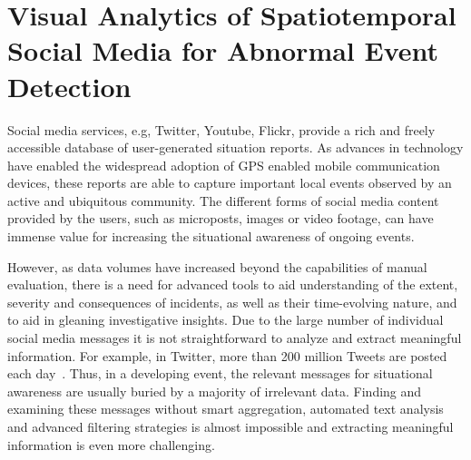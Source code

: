 \chapter{Visual Analytics of Spatiotemporal Social Media for Abnormal Event Detection}

Social media services, e.g, Twitter, Youtube, Flickr, provide a rich and freely accessible 
database of user-generated situation reports. As advances in technology have enabled
the widespread adoption of GPS enabled mobile communication
devices, these reports are able to capture important local events observed by an active and ubiquitous community.
The different forms of social media content provided by the users,
such as microposts, images or video footage, can have immense value 
for increasing the situational awareness of ongoing events.


However, as data volumes have increased beyond the capabilities of manual evaluation, there is a need for
advanced tools to aid understanding of the extent, severity and consequences of incidents, 
as well as their time-evolving nature, and to aid in gleaning investigative insights. 
Due to the large number of individual social media messages it is not straightforward to analyze and extract meaningful information. 
For example, in Twitter, more than 200 million Tweets are posted each day~\cite{Tweets:2011:Twitter}. 
Thus, in a developing event, the relevant messages for situational awareness are usually buried by a majority of irrelevant data. Finding and examining these messages
without smart aggregation, automated text analysis and advanced filtering strategies is almost impossible and
extracting meaningful information is even more challenging.

